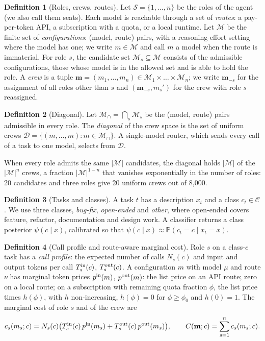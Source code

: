 \documentclass[11pt,a4paper]{article}
\theoremstyle{definition}
\newtheorem{definition}{Definition}
\theoremstyle{remark}
\theoremstyle{definition}
\renewcommand{\Pr}{\mathbb{P}}
\newcommand{\seats}{\mathcal{S}}
\newcommand{\mods}{\mathcal{M}}
\newcommand{\cls}{\mathcal{C}}
\newcommand{\crew}{\mathbf{m}}
\begin{document}
\begin{definition}[Roles, crews, routes]
Let $\seats=\{1,\dots,n\}$ be the roles of the agent (we also call them seats). Each model is reachable through a set of \emph{routes}: a pay-per-token API, a subscription with a quota, or a local runtime. Let $\mods$ be the finite set of \emph{configurations}: (model, route) pairs, with a reasoning-effort setting where the model has one; we write $m\in\mods$ and call $m$ a model when the route is immaterial. For role $s$, the candidate set $\mods_s\subseteq\mods$ consists of the admissible configurations, those whose model is in the allowed set and is able to hold the role. A \emph{crew} is a tuple $\crew=(m_1,\dots,m_n)\in\mods_1\times\dots\times\mods_n$; we write $\crew_{-s}$ for the assignment of all roles other than $s$ and $(\crew_{-s},m_s')$ for the crew with role $s$ reassigned.
\end{definition}

\begin{definition}[Diagonal]
Let $\mods_\cap=\bigcap_{s}\mods_s$ be the (model, route) pairs admissible in every role. The \emph{diagonal} of the crew space is the set of uniform crews $\mathcal D=\{(m,\dots,m):m\in\mods_\cap\}$. A single-model router, which sends every call of a task to one model, selects from $\mathcal D$.
\end{definition}
When every role admits the same $|\mods|$ candidates, the diagonal holds $|\mods|$ of the $|\mods|^n$ crews, a fraction $|\mods|^{1-n}$ that vanishes exponentially in the number of roles: 20 candidates and three roles give 20 uniform crews out of 8{,}000.

\begin{definition}[Tasks and classes]
A task $t$ has a description $x_t$ and a class $c_t\in\cls$. We use three classes, \emph{bug-fix}, \emph{open-ended} and \emph{other}, where open-ended covers feature, refactor, documentation and design work. A classifier returns a class posterior $\psi(c\mid x)$, calibrated so that $\psi(c\mid x)\approx\Pr(c_t=c\mid x_t=x)$.
\end{definition}

\begin{definition}[Call profile and route-aware marginal cost]
Role $s$ on a class-$c$ task has a \emph{call profile}: the expected number of calls $N_s(c)$ and input and output tokens per call $T^{\rm in}_s(c)$, $T^{\rm out}_s(c)$. A configuration $m$ with model $\mu$ and route $\nu$ has marginal token prices $p^{\rm in}(m)$, $p^{\rm out}(m)$: the list price on an API route; zero on a local route; on a subscription with remaining quota fraction $\phi$, the list price times $h(\phi)$, with $h$ non-increasing, $h(\phi)=0$ for $\phi\ge\phi_0$ and $h(0)=1$. The marginal cost of role $s$ and of the crew are
\begin{equation}
c_s(m_s;c)=N_s(c)\big(T^{\rm in}_s(c)\,p^{\rm in}(m_s)+T^{\rm out}_s(c)\,p^{\rm out}(m_s)\big),\qquad C(\crew;c)=\sum_{s=1}^{n}c_s(m_s;c).
\label{eq:cost}
\end{equation}
\end{definition}
\end{document}
